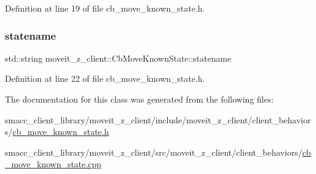 Definition at line 19 of file cb\+\_\+move\+\_\+known\+\_\+state.\+h.

\mbox{\label{classmoveit__z__client_1_1CbMoveKnownState_a53449b08ffa077adb2f1d4efbd37f8d0}} 
\subsubsection{\texorpdfstring{statename}{statename}}
{\footnotesize\ttfamily std\+::string moveit\+\_\+z\+\_\+client\+::\+Cb\+Move\+Known\+State\+::statename}



Definition at line 22 of file cb\+\_\+move\+\_\+known\+\_\+state.\+h.



The documentation for this class was generated from the following files\+:\begin{DoxyCompactItemize}
\item 
smacc\+\_\+client\+\_\+library/moveit\+\_\+z\+\_\+client/include/moveit\+\_\+z\+\_\+client/client\+\_\+behaviors/\hyperlink{cb__move__known__state_8h}{cb\+\_\+move\+\_\+known\+\_\+state.\+h}\item 
smacc\+\_\+client\+\_\+library/moveit\+\_\+z\+\_\+client/src/moveit\+\_\+z\+\_\+client/client\+\_\+behaviors/\hyperlink{cb__move__known__state_8cpp}{cb\+\_\+move\+\_\+known\+\_\+state.\+cpp}\end{DoxyCompactItemize}
